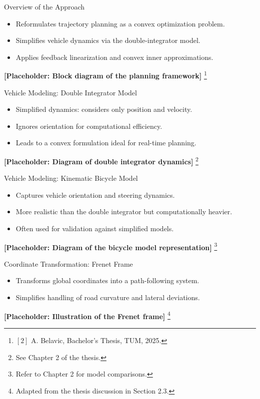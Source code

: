 \documentclass[shortpres,aspectratio=43]{beamer}
\newcommand\blfootnote[1]{%
  \begingroup
  \renewcommand\thefootnote{}\footnote{#1}%
  \addtocounter{footnote}{-1}%
  \endgroup
}
\begin{document}
\begin{frame}{Overview of the Approach}
  \begin{itemize}
    \item Reformulates trajectory planning as a convex optimization problem.
    \item Simplifies vehicle dynamics via the double-integrator model.
    \item Applies feedback linearization and convex inner approximations.
  \end{itemize}
  \centering
  \textbf{[Placeholder: Block diagram of the planning framework]}
  \blfootnote{\tiny $[2]$ A.
    Belavic, Bachelor’s Thesis, TUM, 2025.
  }
\end{frame}

\begin{frame}{Vehicle Modeling: Double Integrator Model}
  \begin{itemize}
    \item Simplified dynamics: considers only position and velocity.
    \item Ignores orientation for computational efficiency.
    \item Leads to a convex formulation ideal for real-time planning.
  \end{itemize}
  \centering
  \textbf{[Placeholder: Diagram of double integrator dynamics]}
  \blfootnote{\tiny See Chapter 2 of the thesis.}
\end{frame}

\begin{frame}{Vehicle Modeling: Kinematic Bicycle Model}
  \begin{itemize}
    \item Captures vehicle orientation and steering dynamics.
    \item More realistic than the double integrator but computationally heavier.
    \item Often used for validation against simplified models.
  \end{itemize}
  \centering
  \textbf{[Placeholder: Diagram of the bicycle model representation]}
  \blfootnote{\tiny Refer to Chapter 2 for model comparisons.}
\end{frame}

\begin{frame}{Coordinate Transformation: Frenet Frame}
  \begin{itemize}
    \item Transforms global coordinates into a path-following system.
    \item Simplifies handling of road curvature and lateral deviations.
  \end{itemize}
  \centering
  \textbf{[Placeholder: Illustration of the Frenet frame]}
  \blfootnote{\tiny Adapted from the thesis discussion in Section 2.3.}
\end{frame}
\end{document}

